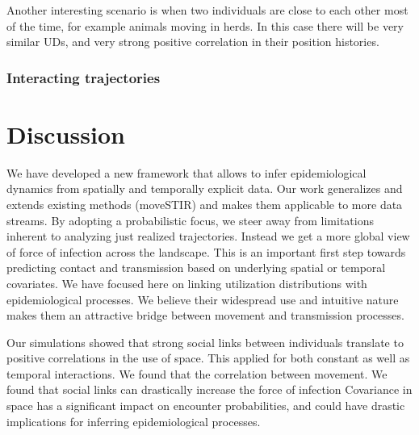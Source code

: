 \documentclass[letterpaper]{article}
\begin{document}
Another interesting scenario is when two individuals are close to each other most of the time, for example animals moving in herds. In this case there will be very similar UDs, and very strong positive correlation in their position histories. 

\subsubsection*{Interacting trajectories}
 
\section*{Discussion}
We have developed a new framework that allows to infer epidemiological dynamics from spatially and temporally explicit data. Our work generalizes and extends existing methods (moveSTIR) and makes them applicable to more data streams. 
By adopting a probabilistic focus, we steer away from limitations inherent to analyzing just realized trajectories. Instead we get a more global view of force of infection across the landscape. This is an important first step towards predicting contact and transmission based on underlying spatial or temporal covariates. %
We have focused here on linking utilization distributions with epidemiological processes. We believe their widespread use and intuitive nature makes them an attractive bridge between movement and transmission processes. 

% 
Our simulations showed that strong social links between individuals translate to positive correlations in the use of space. This applied for both constant as well as temporal interactions. 
We found that the correlation between movement. We found that  social links can drastically increase the force of infection
Covariance in space has a significant impact on encounter probabilities, and could have drastic implications for inferring epidemiological processes. 
\end{document}

